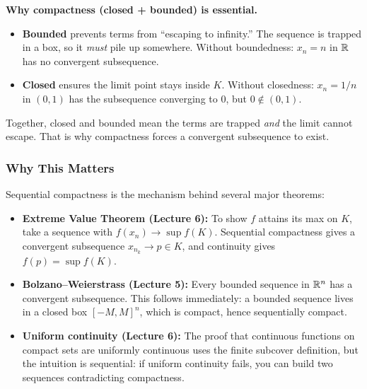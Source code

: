\documentclass[../master/master.tex]{subfiles}
\begin{document}
\begin{notebox}
\textbf{Why compactness (closed + bounded) is essential.}
\begin{itemize}
    \item \textbf{Bounded} prevents terms from ``escaping to infinity.'' The sequence is trapped in a box, so it \emph{must} pile up somewhere. Without boundedness: $x_n = n$ in $\mathbb{R}$ has no convergent subsequence.
    \item \textbf{Closed} ensures the limit point stays inside $K$. Without closedness: $x_n = 1/n$ in $(0,1)$ has the subsequence converging to $0$, but $0 \notin (0,1)$.
\end{itemize}
Together, closed and bounded mean the terms are trapped \emph{and} the limit cannot escape. That is why compactness forces a convergent subsequence to exist.
\end{notebox}

\subsubsection*{Why This Matters}

Sequential compactness is the mechanism behind several major theorems:
\begin{itemize}
    \item \textbf{Extreme Value Theorem (Lecture 6):} To show $f$ attains its max on $K$, take a sequence with $f(x_n) \to \sup f(K)$. Sequential compactness gives a convergent subsequence $x_{n_k} \to p \in K$, and continuity gives $f(p) = \sup f(K)$.
    \item \textbf{Bolzano--Weierstrass (Lecture 5):} Every bounded sequence in $\mathbb{R}^n$ has a convergent subsequence. This follows immediately: a bounded sequence lives in a closed box $[-M, M]^n$, which is compact, hence sequentially compact.
    \item \textbf{Uniform continuity (Lecture 6):} The proof that continuous functions on compact sets are uniformly continuous uses the finite subcover definition, but the intuition is sequential: if uniform continuity fails, you can build two sequences contradicting compactness.
\end{itemize}
\end{document}
